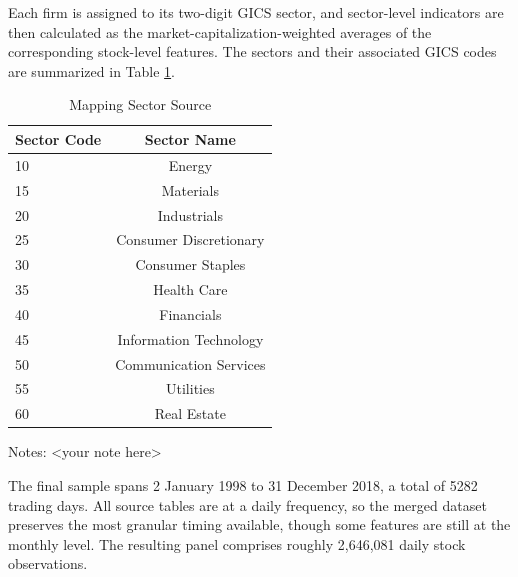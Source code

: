 Each firm is assigned to its two-digit GICS sector, and sector-level indicators are then calculated as the market-capitalization-weighted averages of the corresponding stock-level features.  The sectors and their associated GICS codes are summarized in Table \ref{tab:sectors_mapp}.  

\begin{table}[htbp]
     \centering
     \caption{Mapping Sector Source}
     \label{tab:sectors_mapp}
     \begin{threeparttable}             %
         \begin{tabular}{@{}l c@{}}
             \toprule
             \textbf{Sector Code} & \textbf{Sector Name}\\
             \midrule
             10 & Energy\\
             15 & Materials\\
             20 & Industrials\\
             25 & Consumer Discretionary\\
             30 & Consumer Staples\\
             35 & Health Care\\
             40 & Financials\\
             45 & Information Technology\\
             50 & Communication Services\\
             55 & Utilities\\
             60 & Real Estate\\
             \bottomrule
         \end{tabular}
 
         \begin{tablenotes}
             \footnotesize
             \item[] Notes: <your note here>
         \end{tablenotes}
     \end{threeparttable}               %
 \end{table}

The final sample spans 2 January 1998 to 31 December 2018, a total of 5282 trading days. All source tables are at a daily frequency, so the merged dataset preserves the most granular timing available, though some features are still at the monthly level. The resulting panel comprises roughly 2,646,081 daily stock observations. 

